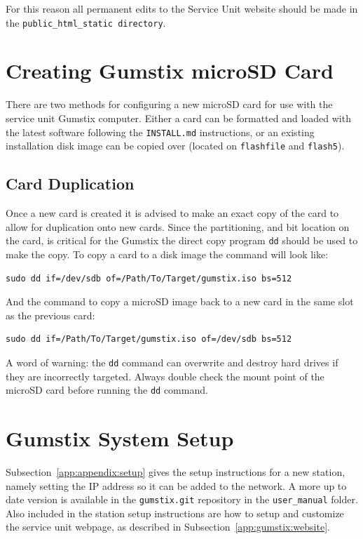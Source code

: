 For this reason all permanent edits to the Service Unit website should be made in the \texttt{public\_html\_static directory}.

\section{Creating Gumstix microSD Card}

There are two methods for configuring a new microSD card for use with the service unit Gumstix computer.
Either a card can be formatted and loaded with the latest software following the \texttt{INSTALL.md} instructions, or an existing installation disk image can be copied over (located on \texttt{flashfile} and \texttt{flash5}).

\subsection{Card Duplication}
\label{app:gumstix:duplication}

Once a new card is created it is advised to make an exact copy of the card to allow for duplication onto new cards.
Since the partitioning, and bit location on the card, is critical for the Gumstix the direct copy program \texttt{dd} should be used to make the copy.
To copy a card to a disk image the command will look like:

\begin{verbatim}
sudo dd if=/dev/sdb of=/Path/To/Target/gumstix.iso bs=512
\end{verbatim}

And the command to copy a microSD image back to a new card in the same slot as the previous card:

\begin{verbatim}
sudo dd if=/Path/To/Target/gumstix.iso of=/dev/sdb bs=512
\end{verbatim}

A word of warning: the \texttt{dd} command can overwrite and destroy hard drives if they are incorrectly targeted.
Always double check the mount point of the microSD card before running the \texttt{dd} command.

\section{Gumstix System Setup}

Subsection~\ref{app:appendix:setup} gives the setup instructions for a new station, namely setting the IP address so it can be added to the network.
A more up to date version is available in the \texttt{gumstix.git} repository in the \texttt{user\_manual} folder.
Also included in the station setup instructions are how to setup and customize the service unit webpage, as described in Subsection~\ref{app:gumstix:website}.

